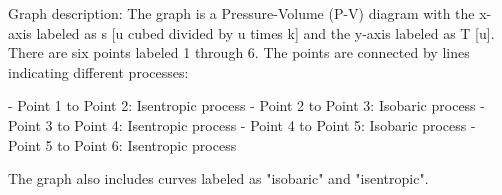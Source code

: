 Graph description: The graph is a Pressure-Volume (P-V) diagram with the x-axis labeled as s [u cubed divided by u times k] and the y-axis labeled as T [u]. There are six points labeled 1 through 6. The points are connected by lines indicating different processes:

- Point 1 to Point 2: Isentropic process
- Point 2 to Point 3: Isobaric process
- Point 3 to Point 4: Isentropic process
- Point 4 to Point 5: Isobaric process
- Point 5 to Point 6: Isentropic process

The graph also includes curves labeled as "isobaric" and "isentropic".